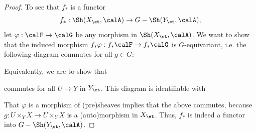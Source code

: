 \begin{proof}
    To see that $f_*$ is a functor
    $$f_*: \Sh(X_{\et}, \calA) \to G-\Sh(Y_{\et}, \calA),$$
    let $\varphi: \calF \to \calG$ be any morphism in $\Sh(X_{\et}, \calA)$. We want to show that the induced morphism $f_* \varphi: f_* \calF \to f_* \calG$ is $G$-equivariant, i.e. the following diagram commutes for all $g \in G$:
    \begin{center}
    \end{center}
    Equivalently, we are to show that
    \begin{center}
    \end{center}
    commutes for all $U \to Y$ in $Y_{\et}$. This diagram is identifiable with
    \begin{center}
    \end{center}
    That $\varphi$ is a morphism of (pre)sheaves implies that the above commutes, because $g: U \times_Y X \to U \times_Y X$ is a (auto)morphism in $X_{\et}$. Thus, $f_*$ is indeed a functor into $G-\Sh(Y_{\et}, \calA)$.
\end{proof}